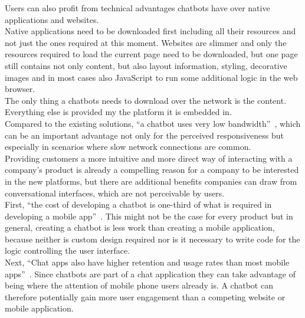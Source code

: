 Users can also profit from technical advantages chatbots have over native applications and websites.
\\
Native applications need to be downloaded first including all their resources and not just the ones required at this moment.
Websites are slimmer and only the resources required to load the current page need to be downloaded,
but one page still contains not only content, but also layout information, styling, decorative images and in most cases also JavaScript to run some additional logic in the web browser.
\\
The only thing a chatbots needs to download over the network is the content.
Everything else is provided my the platform it is embedded in.
\\
Compared to the existing solutions, ``a chatbot uses very low bandwidth''~\cite{techinasia}, which can be an important advantage not only for the perceived responsiveness but especially in scenarios where slow network connections are common.
\\

Providing customers a more intuitive and more direct way of interacting with a company's product is already a compelling reason for a company to be interested in the new platforms, but there are additional benefits companies can draw from conversational interfaces, which are not perceivable by users.
\\

First, ``the cost of developing a chatbot is one-third of what is required in developing a mobile app''~\cite{techinasia}.
This might not be the case for every product but in general, creating a chatbot is less work than creating a mobile application, because neither is custom design required nor is it necessary to write code for the logic controlling the user interface.
\\

Next, ``Chat apps also have higher retention and usage rates than most mobile apps''~\cite{businessinsider}.
Since chatbots are part of a chat application they can take advantage of being where the attention of mobile phone users already is.
A chatbot can therefore potentially gain more user engagement than a competing website or mobile application.
\\

